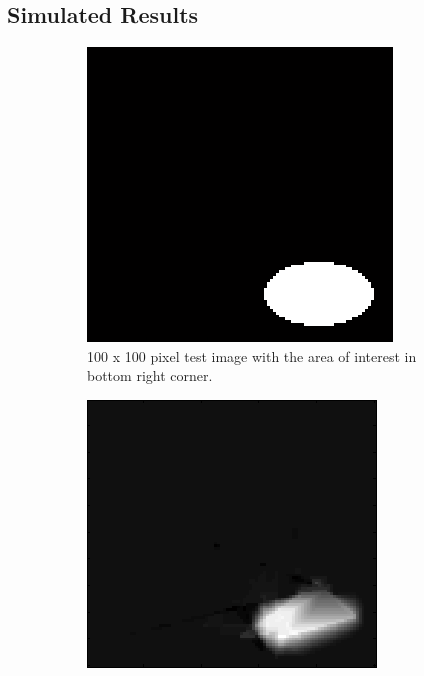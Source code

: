 \documentclass[english]{article}\usepackage[]{graphicx}\usepackage[]{color}
\begin{document}
\subsection{Simulated Results}
\begin{figure}[H]
\centering
\begin{subfigure}{.22\textwidth}
  \centering
    \includegraphics[width=1\linewidth]{figures/adaptiveresultoriginal}
  \caption{100 x 100 pixel test image with the area of interest in bottom right corner.}
  \vspace{0pt}
  \label{fig:adp_sim_orig}
\end{subfigure}%
\hspace{10pt}
\begin{subfigure}{.22\textwidth}
  \centering
    \includegraphics[width=1\linewidth]{figures/nonadaptiveresultrec}

\end{subfigure}
\end{figure}
\end{document}

